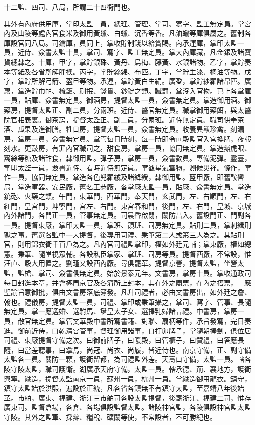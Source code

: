 十二監、四司、八局，所謂二十四衙門也。

其外有內府供用庫，掌印太監一員，總理、管理、掌司、寫字、監工無定員。掌宮內及山陵等處內官食米及御用黃蠟、白蠟、沉香等香。凡油蠟等庫俱屬之。舊制各庫設官同八局。司鑰庫，員同上，掌收貯制錢以給賞賜。內承運庫，掌印太監一員，近侍、僉書太監十員，掌司、寫字、監工無定員。掌大內庫藏，凡金銀及諸寶貨總隸之。十庫，甲字，掌貯銀硃、黃丹、烏梅、藤黃、水銀諸物。乙字，掌貯奏本等紙及各省所解胖襖。丙字，掌貯絲綿、布匹。丁字，掌貯生漆、桐油等物。戊字，掌貯所解弓箭、盔甲等物。承運，掌貯黃白生絹。廣盈，掌貯紗羅諸帛匹。廣惠，掌造貯巾帕、梳籠、刷抿、錢貫、鈔錠之類。贓罰，掌沒入官物。已上各掌庫一員，貼庫、僉書無定員。御酒房，提督太監一員，僉書無定員。掌造御用酒。御藥房，提督太監正、副二員，分兩班。近侍、醫官無定員。職掌御用藥餌，與太醫院官相表裏。御茶房，提督太監正、副二員，分兩班。近侍無定員。職司供奉茶酒、瓜果及進御膳。牲口房，提督太監一員，僉書無定員。收養異獸珍禽。刻漏房，掌房一員，僉書無定員。掌管每日時刻，每一時即令直殿監官入宮換牌，夜報刻水。更鼓房，有罪內官職司之。甜食房，掌房一員，協同無定員。掌造辦虎眼、窩絲等糖及諸甜食，隸御用監。彈子房，掌房一員，僉書數員。專備泥彈。靈臺，掌印太監一員，僉書近侍、看時近侍無定員。掌觀星氣雲物，測候災祥。條作，掌作一員，協同無定員。掌造各色兜羅絨及諸絳綬，隸御用監。盔甲廠，即舊鞍轡局，掌造軍器。安民廠，舊名王恭廠，各掌廠太監一員，貼廠、僉書無定員。掌造銃砲、火藥之類。午門，東華門，西華門，奉天門，玄武門，左、右順門，左、右紅門，皇宮門，坤寧門，宮左、右門。東宮春和門，後門，左、右門，皇城、京城內外諸門，各門正一員，管事無定員。司晨昏啟閉，關防出入。舊設門正、門副各一員。提督東廠，掌印太監一員，掌班、領班、司房無定員。貼刑二員，掌刺緝刑獄之事。舊選各監中一人提督，後專用司禮、秉筆第二人或第三人為之。其貼刑官，則用錦衣衛千百戶為之。凡內官司禮監掌印，權如外廷元輔；掌東廠，權如總憲。秉筆、隨堂視眾輔。各設私臣掌家、掌班、司房等員。提督西廠，不常設，惟汪直、穀大用置之。劉瑾又設西內廠。尋俱罷革。提督京營，提督太監，坐營太監，監槍、掌司、僉書俱無定員。始於景泰元年。文書房，掌房十員。掌收通政司每日封進本章，并會極門京官及各籓所上封本，其在外之閣票，在內之搭票，一應聖諭旨意御批，俱由文書房落底簿發。凡升司禮者，必由文書房出，如外廷之詹、翰也。禮儀房，提督太監一員，司禮、掌印或秉筆攝之，掌司、寫字、管事、長隨無定員。掌一應選婚、選駙馬、誕皇太子女、選擇乳婦諸吉禮。中書房，掌房一員，散官無定員。掌管文華殿中書所寫書籍、對聯、扇柄等件，承旨發寫，完日奏進。御前近侍，曰乾清宮管事，督理御用諸事，曰打卯牌子，掌隨朝捧劍，俱位居司禮、東廠提督守備之次。曰御前牌子，曰暖殿，曰管櫃子，曰贊禮，曰答應長隨，曰當差聽事，曰拿馬，尚冠、尚衣、尚履，皆近侍也。南京守備，正、副守備太監各一員。關防一顆，護衛留都，為司禮監外差。天壽山守備，太監一員。轄各陵守陵太監，職司護衛。湖廣承天府守備，太監一員。轄承德、荊、襄地方，護衛興寧。織造，提督太監南京一員，蘇州一員，杭州一員。掌織造御用龍衣。鎮守，鎮守太監始於洪熙，遍設於正統，凡各省各鎮無不有鎮守太監，至嘉靖八年後始革。市舶，廣東、福建、浙江三市舶司各設太監提督，後罷浙江、福建二司，惟存廣東司。監督倉場，各倉、各場俱設監督太監。諸陵神宮監，各陵俱設神宮監太監守陵。其外之監軍、採辦、糧稅、礦關等使，不常設者，不可勝紀也。

